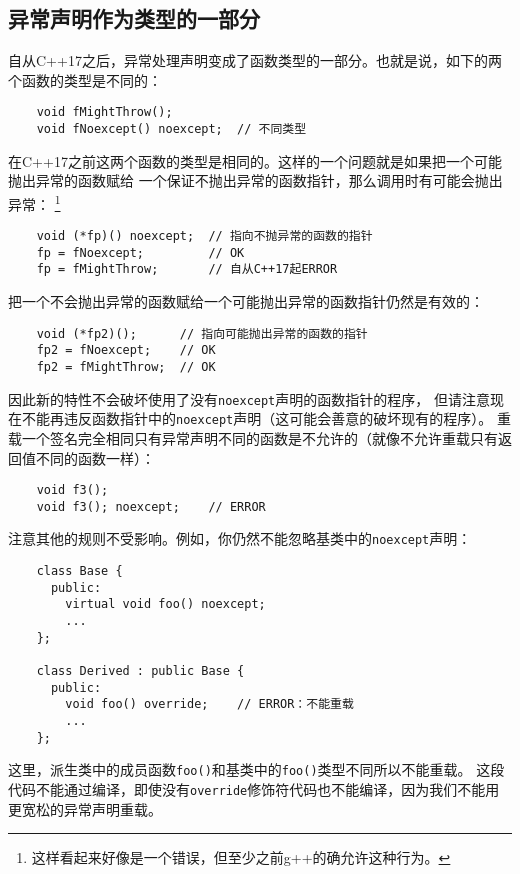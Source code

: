 \subsection{异常声明作为类型的一部分}\label{ch8.7}
自从C++17之后，异常处理声明变成了函数类型的一部分。也就是说，如下的两个函数的类型是不同的：
\begin{lstlisting}
    void fMightThrow();
    void fNoexcept() noexcept;  // 不同类型
\end{lstlisting}
在C++17之前这两个函数的类型是相同的。这样的一个问题就是如果把一个可能抛出异常的函数赋给
一个保证不抛出异常的函数指针，那么调用时有可能会抛出异常：
\footnote{这样看起来好像是一个错误，但至少之前g++的确允许这种行为。}
\begin{lstlisting}
    void (*fp)() noexcept;  // 指向不抛异常的函数的指针
    fp = fNoexcept;         // OK
    fp = fMightThrow;       // 自从C++17起ERROR
\end{lstlisting}
把一个不会抛出异常的函数赋给一个可能抛出异常的函数指针仍然是有效的：
\begin{lstlisting}
    void (*fp2)();      // 指向可能抛出异常的函数的指针
    fp2 = fNoexcept;    // OK
    fp2 = fMightThrow;  // OK
\end{lstlisting}
因此新的特性不会破坏使用了没有\texttt{noexcept}声明的函数指针的程序，
但请注意现在不能再违反函数指针中的\texttt{noexcept}声明（这可能会善意的破坏现有的程序）。
重载一个签名完全相同只有异常声明不同的函数是不允许的（就像不允许重载只有返回值不同的函数一样）：
\begin{lstlisting}
    void f3();
    void f3(); noexcept;    // ERROR
\end{lstlisting}
注意其他的规则不受影响。例如，你仍然不能忽略基类中的\texttt{noexcept}声明：
\begin{lstlisting}
    class Base {
      public:
        virtual void foo() noexcept;
        ...
    };

    class Derived : public Base {
      public:
        void foo() override;    // ERROR：不能重载
        ...
    };
\end{lstlisting}
这里，派生类中的成员函数\texttt{foo()}和基类中的\texttt{foo()}类型不同所以不能重载。
这段代码不能通过编译，即使没有\texttt{override}修饰符代码也不能编译，因为我们不能用
更宽松的异常声明重载。

